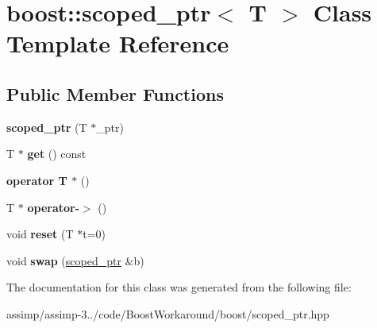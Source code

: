 \hypertarget{classboost_1_1scoped__ptr}{\section{boost\+:\+:scoped\+\_\+ptr$<$ T $>$ Class Template Reference}
\label{classboost_1_1scoped__ptr}
}
\subsection*{Public Member Functions}
\begin{DoxyCompactItemize}
\item 
\hypertarget{classboost_1_1scoped__ptr_a8a72e9ffbc0aa980255fc14ea1fd0a53}{{\bfseries scoped\+\_\+ptr} (T $\ast$\+\_\+ptr)}\label{classboost_1_1scoped__ptr_a8a72e9ffbc0aa980255fc14ea1fd0a53}

\item 
\hypertarget{classboost_1_1scoped__ptr_ae119d60d47ab36565ca283cfb0773795}{T $\ast$ {\bfseries get} () const }\label{classboost_1_1scoped__ptr_ae119d60d47ab36565ca283cfb0773795}

\item 
\hypertarget{classboost_1_1scoped__ptr_a88bf4310aa0c42246857d7b3d98ecec4}{{\bfseries operator T $\ast$} ()}\label{classboost_1_1scoped__ptr_a88bf4310aa0c42246857d7b3d98ecec4}

\item 
\hypertarget{classboost_1_1scoped__ptr_a2534107ee6a333e7396e13d8fc1abfb4}{T $\ast$ {\bfseries operator-\/$>$} ()}\label{classboost_1_1scoped__ptr_a2534107ee6a333e7396e13d8fc1abfb4}

\item 
\hypertarget{classboost_1_1scoped__ptr_ad63d8ed3153a4d8c5480ff4026bb5e6a}{void {\bfseries reset} (T $\ast$t=0)}\label{classboost_1_1scoped__ptr_ad63d8ed3153a4d8c5480ff4026bb5e6a}

\item 
\hypertarget{classboost_1_1scoped__ptr_a9cceca1b7b8d7ab9531ebafc4ec827b6}{void {\bfseries swap} (\hyperlink{classboost_1_1scoped__ptr}{scoped\+\_\+ptr} \&b)}\label{classboost_1_1scoped__ptr_a9cceca1b7b8d7ab9531ebafc4ec827b6}

\end{DoxyCompactItemize}


The documentation for this class was generated from the following file\+:\begin{DoxyCompactItemize}
\item 
assimp/assimp-\/3../code/\+Boost\+Workaround/boost/scoped\+\_\+ptr.\+hpp\end{DoxyCompactItemize}
